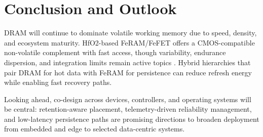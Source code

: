 \section{Conclusion and Outlook}

DRAM will continue to dominate volatile working memory due to speed, density, and ecosystem maturity. HfO2-based FeRAM/FeFET offers a CMOS-compatible non-volatile complement with fast access, though variability, endurance dispersion, and integration limits remain active topics \cite{noheda2023,martin2020}. Hybrid hierarchies that pair DRAM for hot data with FeRAM for persistence can reduce refresh energy while enabling fast recovery paths.

Looking ahead, co-design across devices, controllers, and operating systems will be central: retention-aware placement, telemetry-driven reliability management, and low-latency persistence paths are promising directions to broaden deployment from embedded and edge to selected data-centric systems.
